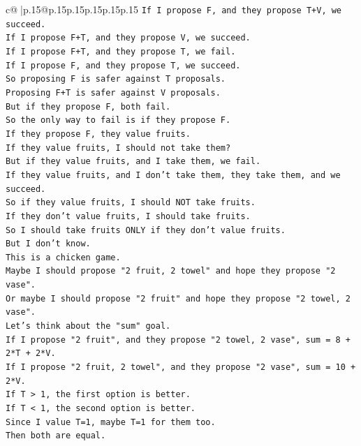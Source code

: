 \documentclass{article}
\begin{document}
{\begin{supertabular}{c@{$\;$}|p{.15\linewidth}@{}p{.15\linewidth}p{.15\linewidth}p{.15\linewidth}p{.15\linewidth}p{.15\linewidth}}
{{{\texttt{If I propose F, and they propose T+V, we succeed.} \\
\texttt{If I propose F+T, and they propose V, we succeed.} \\
\texttt{If I propose F+T, and they propose T, we fail.} \\
\texttt{If I propose F, and they propose T, we succeed.} \\
\texttt{So proposing F is safer against T proposals.} \\
\texttt{Proposing F+T is safer against V proposals.} \\
\texttt{But if they propose F, both fail.} \\
\texttt{So the only way to fail is if they propose F.} \\
\texttt{If they propose F, they value fruits.} \\
\texttt{If they value fruits, I should not take them?} \\
\texttt{But if they value fruits, and I take them, we fail.} \\
\texttt{If they value fruits, and I don't take them, they take them, and we succeed.} \\
\texttt{So if they value fruits, I should NOT take fruits.} \\
\texttt{If they don't value fruits, I should take fruits.} \\
\texttt{So I should take fruits ONLY if they don't value fruits.} \\
\texttt{But I don't know.} \\
\texttt{This is a chicken game.} \\
\texttt{Maybe I should propose "2 fruit, 2 towel" and hope they propose "2 vase".} \\
\texttt{Or maybe I should propose "2 fruit" and hope they propose "2 towel, 2 vase".} \\
\texttt{Let's think about the "sum" goal.} \\
\texttt{If I propose "2 fruit", and they propose "2 towel, 2 vase", sum = 8 + 2*T + 2*V.} \\
\texttt{If I propose "2 fruit, 2 towel", and they propose "2 vase", sum = 10 + 2*V.} \\
\texttt{If T > 1, the first option is better.} \\
\texttt{If T < 1, the second option is better.} \\
\texttt{Since I value T=1, maybe T=1 for them too.} \\
\texttt{Then both are equal.} \\
}}}
\end{supertabular}}
\end{document}
